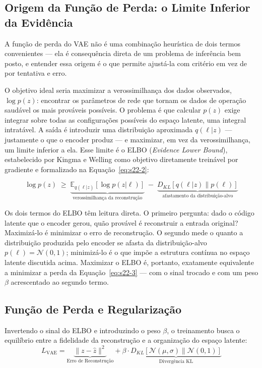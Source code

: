 \documentclass[12pt,a4paper]{article}
\numberwithin{equation}{section}
\numberwithin{table}{section}
\numberwithin{figure}{section}
\begin{document}
	\subsection{Origem da Função de Perda: o Limite Inferior da Evidência}

	A função de perda do VAE não é uma combinação heurística de dois termos convenientes — ela é consequência direta de um problema de inferência bem posto, e entender essa origem é o que permite ajustá-la com critério em vez de por tentativa e erro.

	O objetivo ideal seria maximizar a verossimilhança dos dados observados, $\log p(z)$: encontrar os parâmetros de rede que tornam os dados de operação saudável os mais prováveis possíveis. O problema é que calcular $p(z)$ exige integrar sobre todas as configurações possíveis do espaço latente, uma integral intratável. A saída é introduzir uma distribuição aproximada $q(\ell|z)$ — justamente o que o encoder produz — e maximizar, em vez da verossimilhança, um limite inferior a ela. Esse limite é o ELBO (\textit{Evidence Lower Bound}), estabelecido por Kingma e Welling como objetivo diretamente treinável por gradiente \cite{vae} e formalizado na Equação~\eqref{eq:s22-2}:

	\begin{equation}\label{eq:s22-2}
	\log p(z) \;\ge\; \underbrace{\mathbb{E}_{q(\ell|z)}\left[ \log p(z|\ell) \right]}_{\text{verossimilhança da reconstrução}} \;-\; \underbrace{D_{KL}\left[ q(\ell|z) \parallel p(\ell) \right]}_{\text{afastamento da distribuição-alvo}}
\end{equation}

	Os dois termos do ELBO têm leitura direta. O primeiro pergunta: dado o código latente que o encoder gerou, quão provável é reconstruir a entrada original? Maximizá-lo é minimizar o erro de reconstrução. O segundo mede o quanto a distribuição produzida pelo encoder se afasta da distribuição-alvo $p(\ell) = \mathcal{N}(0,1)$; minimizá-lo é o que impõe a estrutura contínua no espaço latente discutida acima. Maximizar o ELBO é, portanto, exatamente equivalente a minimizar a perda da Equação~\eqref{eq:s22-3} — com o sinal trocado e com um peso $\beta$ acrescentado ao segundo termo.

	\subsection{Função de Perda e Regularização}
	Invertendo o sinal do ELBO e introduzindo o peso $\beta$, o treinamento busca o equilíbrio entre a fidelidade da reconstrução e a organização do espaço latente:
	\begin{equation}\label{eq:s22-3}
	L_{\text{VAE}} = \underbrace{\| z - \hat{z} \|^2}_{\text{Erro de Reconstrução}} + \beta \cdotp \underbrace{D_{KL} [ \mathcal{N}(\mu, \sigma) \parallel \mathcal{N}(0, 1) ]}_{\text{Divergência KL}}
\end{equation}
\end{document}
